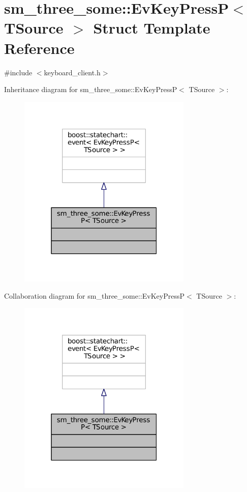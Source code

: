 \hypertarget{structsm__three__some_1_1EvKeyPressP}{}\section{sm\+\_\+three\+\_\+some\+:\+:Ev\+Key\+PressP$<$ T\+Source $>$ Struct Template Reference}
\label{structsm__three__some_1_1EvKeyPressP}


{\ttfamily \#include $<$keyboard\+\_\+client.\+h$>$}



Inheritance diagram for sm\+\_\+three\+\_\+some\+:\+:Ev\+Key\+PressP$<$ T\+Source $>$\+:
\nopagebreak
\begin{figure}[H]
\begin{center}
\leavevmode
\includegraphics[width=235pt]{structsm__three__some_1_1EvKeyPressP__inherit__graph}
\end{center}
\end{figure}


Collaboration diagram for sm\+\_\+three\+\_\+some\+:\+:Ev\+Key\+PressP$<$ T\+Source $>$\+:
\nopagebreak
\begin{figure}[H]
\begin{center}
\leavevmode
\includegraphics[width=235pt]{structsm__three__some_1_1EvKeyPressP__coll__graph}
\end{center}
\end{figure}



